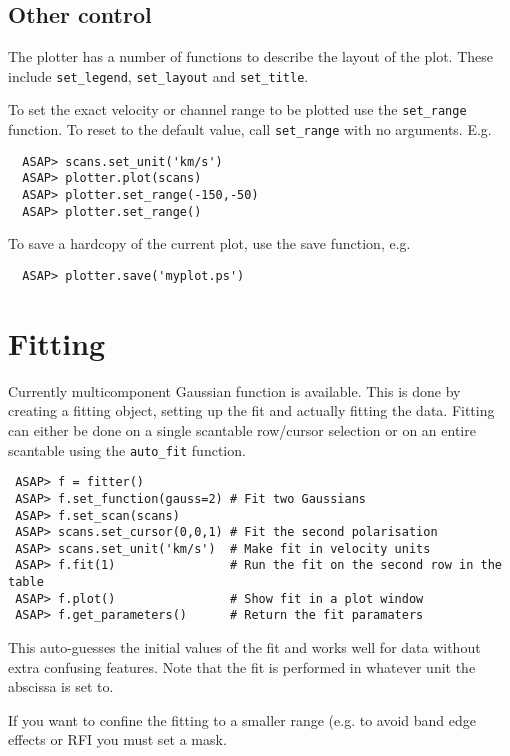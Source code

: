 \documentclass[11pt]{article}
\newcommand{\cmd}[1]{{\tt #1}}
\begin{document}
\subsection{Other control}

The plotter has a number of functions to describe the layout of the
plot. These include \cmd{set\_legend}, \cmd{set\_layout} and \cmd{set\_title}.

To set the exact velocity or channel range to be plotted use the
\cmd{set\_range} function. To reset to the default value, call
\cmd{set\_range} with no arguments. E.g.

\begin{verbatim}
  ASAP> scans.set_unit('km/s')
  ASAP> plotter.plot(scans)
  ASAP> plotter.set_range(-150,-50)
  ASAP> plotter.set_range()
\end{verbatim}

To save a hardcopy of the current plot, use the save function, e.g. 

\begin{verbatim}
  ASAP> plotter.save('myplot.ps')
\end{verbatim}

\section{Fitting}

Currently multicomponent Gaussian function is available. This is done
by creating a fitting object, setting up the fit and actually fitting
the data. Fitting can either be done on a single scantable row/cursor
selection or on an entire scantable using the \cmd{auto\_fit} function.

\begin{verbatim}
 ASAP> f = fitter()
 ASAP> f.set_function(gauss=2) # Fit two Gaussians
 ASAP> f.set_scan(scans)
 ASAP> scans.set_cursor(0,0,1) # Fit the second polarisation
 ASAP> scans.set_unit('km/s')  # Make fit in velocity units
 ASAP> f.fit(1)                # Run the fit on the second row in the table
 ASAP> f.plot()                # Show fit in a plot window
 ASAP> f.get_parameters()      # Return the fit paramaters
\end{verbatim}

This auto-guesses the initial values of the fit and works well for data
without extra confusing features. Note that the fit is performed in
whatever unit the abscissa is set to.

If you want to confine the fitting to a smaller range (e.g. to avoid
band edge effects or RFI you must set a mask.
\end{document}
